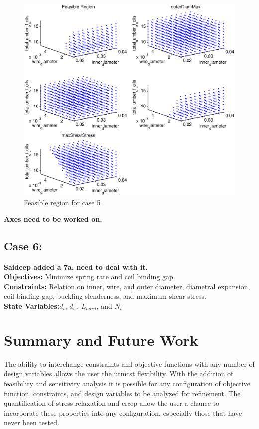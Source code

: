 \documentclass[10pt]{article}
\begin{document}
				\begin{figure}[h!]
		 \begin{center}\includegraphics[scale=.50]{Case_511_34810.eps}\end{center}
		 \caption{Feasible region for case 5}
		 \label{Feasible Case 5}
		 
		 \end{figure}
		 \textbf{Axes need to be worked on.}

\newpage
\subsection{Case 6:}
\label{subsec:Case6}
\textbf{Saideep added a 7a, need to deal with it.}\\
	\textbf{Objectives:} Minimize spring rate and coil binding gap.\\
	\textbf{Constraints:} Relation on inner, wire, and outer diameter, diametral expansion, coil binding gap, buckling slenderness, and maximum shear stress. \\
		\textbf{State Variables:}$d_{i}$, $d_{w}$, $L_{hard}$, and $N_{t}$ \\

\newpage

\section{Summary and Future Work}
\label{sec:Summary}
The ability to interchange constraints and objective functions with any number of design variables allows the user the utmost flexibility. With the addition of feasibility and sensitivity analysis it is possible for any configuration of objective function, constraints, and design variables to be analyzed for refinement. The quantification of stress relaxation and creep allow the user a chance to incorporate these properties into any configuration, especially those that have never been tested. 
\end{document}
